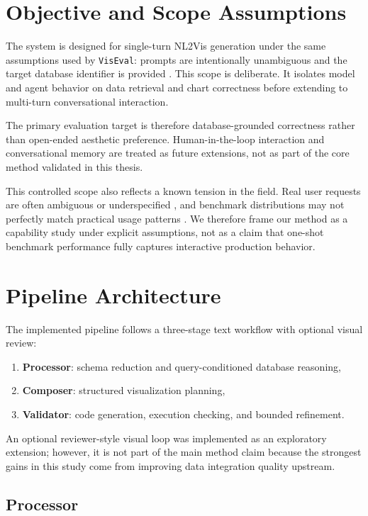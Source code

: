 \documentclass[a4paper,oneside,bibliography=totoc]{scrbook}
\begin{document}
\section{Objective and Scope Assumptions}

The system is designed for single-turn NL2Vis generation under the same assumptions used by \texttt{VisEval}: prompts are intentionally unambiguous and the target database identifier is provided \cite{chen2025viseval}. This scope is deliberate. It isolates model and agent behavior on data retrieval and chart correctness before extending to multi-turn conversational interaction.

The primary evaluation target is therefore database-grounded correctness rather than open-ended aesthetic preference. Human-in-the-loop interaction and conversational memory are treated as future extensions, not as part of the core method validated in this thesis.

This controlled scope also reflects a known tension in the field. Real user requests are often ambiguous or underspecified \cite{maddigan2023chat2vis}, and benchmark distributions may not perfectly match practical usage patterns \cite{nguyen2024bench}. We therefore frame our method as a capability study under explicit assumptions, not as a claim that one-shot benchmark performance fully captures interactive production behavior.

\section{Pipeline Architecture}

The implemented pipeline follows a three-stage text workflow with optional visual review:
\begin{enumerate}
  \item \textbf{Processor}: schema reduction and query-conditioned database reasoning,
  \item \textbf{Composer}: structured visualization planning,
  \item \textbf{Validator}: code generation, execution checking, and bounded refinement.
\end{enumerate}

An optional reviewer-style visual loop was implemented as an exploratory extension; however, it is not part of the main method claim because the strongest gains in this study come from improving data integration quality upstream.

\subsection{Processor}
\end{document}
